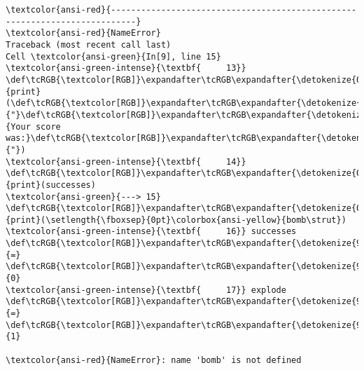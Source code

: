 \documentclass[11pt]{article}
\makeatletter
\newcommand{\boxspacing}{\kern\kvtcb@left@rule\kern\kvtcb@boxsep}
\newcommand{\prompt}[4]{
        {\ttfamily\llap{{\color{#2}[#3]:\hspace{3pt}#4}}\vspace{-\baselineskip}}
    }
\makeatother
\begin{document}
    \begin{Verbatim}[commandchars=\\\{\}, frame=single, framerule=2mm, rulecolor=\color{outerrorbackground}]
\textcolor{ansi-red}{---------------------------------------------------------------------------}
\textcolor{ansi-red}{NameError}                                 Traceback (most recent call last)
Cell \textcolor{ansi-green}{In[9], line 15}
\textcolor{ansi-green-intense}{\textbf{     13}} \def\tcRGB{\textcolor[RGB]}\expandafter\tcRGB\expandafter{\detokenize{0,135,0}}{print}(\def\tcRGB{\textcolor[RGB]}\expandafter\tcRGB\expandafter{\detokenize{175,0,0}}{"}\def\tcRGB{\textcolor[RGB]}\expandafter\tcRGB\expandafter{\detokenize{175,0,0}}{Your score was:}\def\tcRGB{\textcolor[RGB]}\expandafter\tcRGB\expandafter{\detokenize{175,0,0}}{"}) 
\textcolor{ansi-green-intense}{\textbf{     14}} \def\tcRGB{\textcolor[RGB]}\expandafter\tcRGB\expandafter{\detokenize{0,135,0}}{print}(successes)
\textcolor{ansi-green}{---> 15} \def\tcRGB{\textcolor[RGB]}\expandafter\tcRGB\expandafter{\detokenize{0,135,0}}{print}(\setlength{\fboxsep}{0pt}\colorbox{ansi-yellow}{bomb\strut})
\textcolor{ansi-green-intense}{\textbf{     16}} successes \def\tcRGB{\textcolor[RGB]}\expandafter\tcRGB\expandafter{\detokenize{98,98,98}}{=} \def\tcRGB{\textcolor[RGB]}\expandafter\tcRGB\expandafter{\detokenize{98,98,98}}{0}
\textcolor{ansi-green-intense}{\textbf{     17}} explode \def\tcRGB{\textcolor[RGB]}\expandafter\tcRGB\expandafter{\detokenize{98,98,98}}{=} \def\tcRGB{\textcolor[RGB]}\expandafter\tcRGB\expandafter{\detokenize{98,98,98}}{1}

\textcolor{ansi-red}{NameError}: name 'bomb' is not defined
    \end{Verbatim}

    \begin{tcolorbox}[breakable, size=fbox, boxrule=1pt, pad at break*=1mm,colback=cellbackground, colframe=cellborder]
\prompt{In}{incolor}{ }{\boxspacing}
\begin{Verbatim}[commandchars=\\\{\}]

\end{Verbatim}
\end{tcolorbox}

    \begin{tcolorbox}[breakable, size=fbox, boxrule=1pt, pad at break*=1mm,colback=cellbackground, colframe=cellborder]
\prompt{In}{incolor}{ }{\boxspacing}
\begin{Verbatim}[commandchars=\\\{\}]

\end{Verbatim}
\end{tcolorbox}
\end{document}
